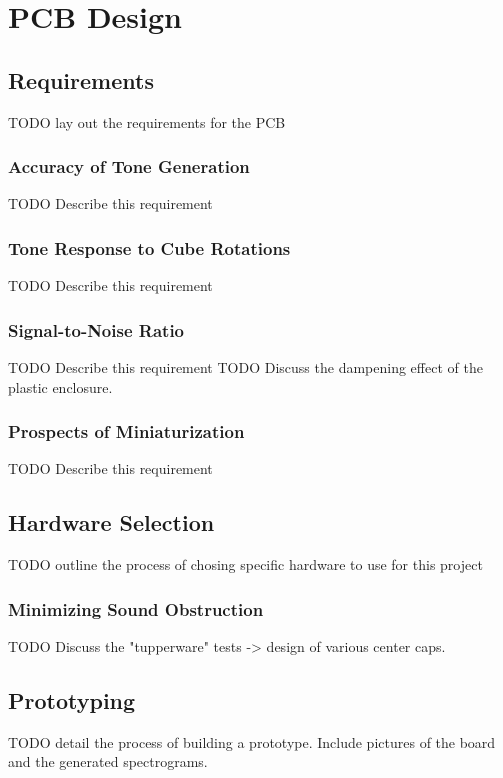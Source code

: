 
\chapter{PCB Design} %

\label{Chapter6} %


\section{Requirements}

TODO lay out the requirements for the PCB

\subsection{Accuracy of Tone Generation}
TODO Describe this requirement

\subsection{Tone Response to Cube Rotations}
TODO Describe this requirement

\subsection{Signal-to-Noise Ratio}
TODO Describe this requirement
TODO Discuss the dampening effect of the plastic enclosure.

\subsection{Prospects of Miniaturization}
TODO Describe this requirement


\section{Hardware Selection}

TODO outline the process of chosing specific hardware to use for this project

\subsection{Minimizing Sound Obstruction}
TODO Discuss the "tupperware" tests -> design of various center caps.


\section{Prototyping}

TODO detail the process of building a prototype. Include pictures of the board and the generated spectrograms.
